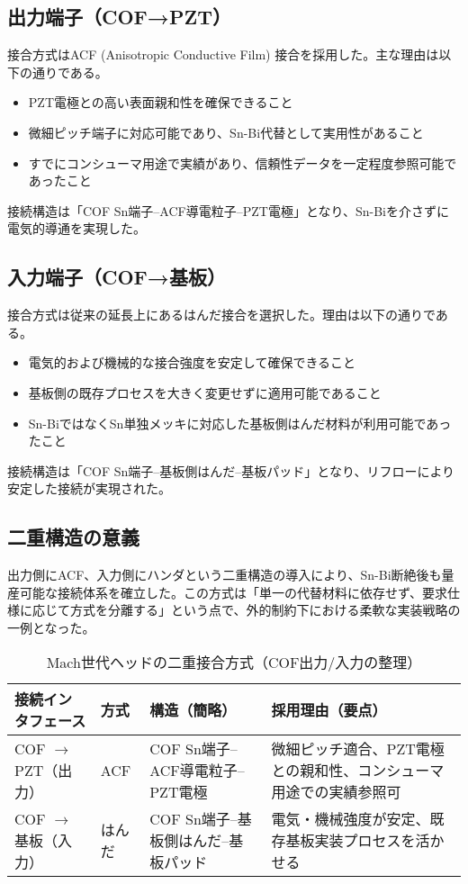 \documentclass[conference]{IEEEtran}
\begin{document}
\subsection{出力端子（COF→PZT）}
接合方式はACF (Anisotropic Conductive Film) 接合を採用した。主な理由は以下の通りである。  
\begin{itemize}
  \item PZT電極との高い表面親和性を確保できること  
  \item 微細ピッチ端子に対応可能であり、Sn-Bi代替として実用性があること  
  \item すでにコンシューマ用途で実績があり、信頼性データを一定程度参照可能であったこと  
\end{itemize}
接続構造は「COF Sn端子–ACF導電粒子–PZT電極」となり、Sn-Biを介さずに電気的導通を実現した。

\subsection{入力端子（COF→基板）}
接合方式は従来の延長上にあるはんだ接合を選択した。理由は以下の通りである。  
\begin{itemize}
  \item 電気的および機械的な接合強度を安定して確保できること  
  \item 基板側の既存プロセスを大きく変更せずに適用可能であること  
  \item Sn-BiではなくSn単独メッキに対応した基板側はんだ材料が利用可能であったこと  
\end{itemize}
接続構造は「COF Sn端子–基板側はんだ–基板パッド」となり、リフローにより安定した接続が実現された。

\subsection{二重構造の意義}
出力側にACF、入力側にハンダという二重構造の導入により、Sn-Bi断絶後も量産可能な接続体系を確立した。この方式は「単一の代替材料に依存せず、要求仕様に応じて方式を分離する」という点で、外的制約下における柔軟な実装戦略の一例となった。

\begin{table}[t]
\centering
\footnotesize
\caption{Mach世代ヘッドの二重接合方式（COF出力/入力の整理）}
\label{tab:dual-bond}
\renewcommand{\arraystretch}{1.1}
\begin{tabularx}{\columnwidth}{@{}p{1.95cm} p{1.25cm} Y Y@{}}
\toprule
接続インタフェース & 方式 & 構造（簡略） & 採用理由（要点） \\
\midrule
COF $\rightarrow$ PZT（出力） & ACF &
COF Sn端子–ACF導電粒子–PZT電極 &
微細ピッチ適合、PZT電極との親和性、コンシューマ用途での実績参照可 \\
\addlinespace[2pt]
COF $\rightarrow$ 基板（入力） & はんだ &
COF Sn端子–基板側はんだ–基板パッド &
電気・機械強度が安定、既存基板実装プロセスを活かせる \\
\bottomrule
\end{tabularx}
\end{table}
\end{document}
